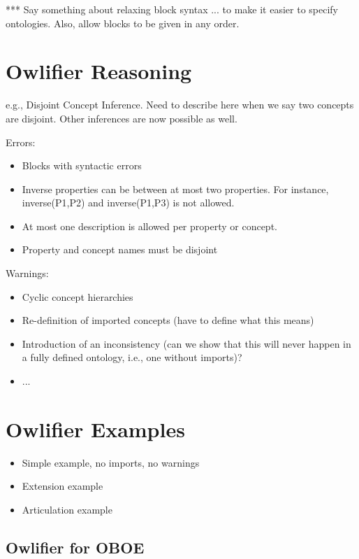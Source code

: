 \documentclass[11pt,onecolumn]{article}
\begin{document}
*** Say something about relaxing block syntax ... to make it easier to
specify ontologies. Also, allow blocks to be given in any order.

\section{\textsf{Owlifier} Reasoning}

e.g., Disjoint Concept Inference. Need to describe here when we say
two concepts are disjoint. Other inferences are now possible as well.

Errors:
\begin{itemize}
\item Blocks with syntactic errors
\item Inverse properties can be between at most two properties. For
  instance, inverse(P1,P2) and inverse(P1,P3) is not allowed.
\item At most one description is allowed per property or concept.
\item Property and concept names must be disjoint
\end{itemize}

Warnings: 
\begin{itemize}
\item Cyclic concept hierarchies
\item Re-definition of imported concepts (have to define what this means)
\item Introduction of an inconsistency (can we show that this will
  never happen in a fully defined ontology, i.e., one without imports)? 
\item ...
\end{itemize}

\section{\textsf{Owlifier} Examples}

\begin{itemize}
\item Simple example, no imports, no warnings
\item Extension example
\item Articulation example
\end{itemize}

\subsection{\textsf{Owlifier} for OBOE}
\end{document}
